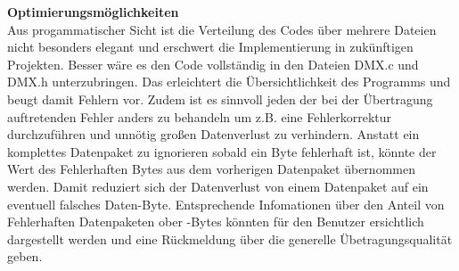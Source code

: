 \textbf{Optimierungsmöglichkeiten}\\
Aus progammatischer Sicht ist die Verteilung des Codes über mehrere Dateien nicht besonders elegant und erschwert die Implementierung in zukünftigen Projekten. Besser wäre es den Code vollständig in den Dateien DMX.c und DMX.h unterzubringen. Das erleichtert die Übersichtlichkeit des Programms und beugt damit Fehlern vor. Zudem ist es sinnvoll jeden der bei der Übertragung auftretenden Fehler anders zu behandeln um z.B. eine Fehlerkorrektur durchzuführen und unnötig großen Datenverlust zu verhindern. Anstatt ein komplettes Datenpaket zu ignorieren sobald ein Byte fehlerhaft ist, könnte der Wert des Fehlerhaften Bytes aus dem vorherigen Datenpaket übernommen werden. Damit reduziert sich der Datenverlust von einem Datenpaket auf ein eventuell falsches Daten-Byte. Entsprechende Infomationen über den Anteil von Fehlerhaften Datenpaketen ober -Bytes könnten für den Benutzer ersichtlich dargestellt werden und eine Rückmeldung über die generelle Übetragungsqualität geben.